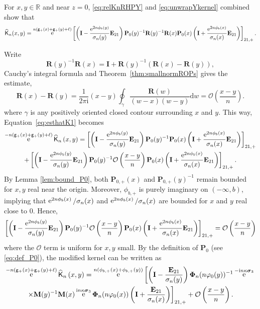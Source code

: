 \documentclass[reqno,a4paper,11pt]{amsart}
\DeclareMathOperator{\ee}{\rm e}
\newcommand{\R}{\mathbb{R}}
\newcommand{\Boh}{\mathcal{O}}
\newcommand{\ii}{\mathrm{i}}
\newcommand{\dd}{\mathrm{d}}
\renewcommand{\bm}{\mathbf}
\newcommand{\msf}{\mathsf}
\newcommand{\wh}{\widehat}
\renewcommand{\sp}{\boldsymbol \sigma}
\theoremstyle{definition}
\theoremstyle{remark}
\numberwithin{equation}{section}
\begin{document}
For $x,y \in \R$ and near $z=0$, \eqref{eq:relKnRHPY} and \eqref{eq:unwrapYkernel} combined show that 
%
\begin{equation}\label{eq:esthatK1}
\wh{\msf K}_n(x,y)
    =\ee^{n(\msf g_+(x)+\msf g_+(y)+\ell)}
    \left[\left(\bm I-\frac{\ee^{2n\phi_{b}(y)}}{\sigma_n(y)}\bm E_{21}\right)\bm P_0(y)^{-1}\bm R(y)^{-1}\bm R(x)\bm P_0(x)\left(\bm I+\frac{\ee^{2n\phi_{b}(x)}}{\sigma_n(x)}\bm E_{21}\right)\right]_{21,+}. 
\end{equation}
%

Write
%
\begin{equation}\label{eq:Rtrick}
\bm R(y)^{-1}\bm R(x)
    =\bm I+\bm R(y)^{-1}\left(\bm R(x)-\bm R(y)\right),
\end{equation}
%
Cauchy's integral formula and Theorem~\ref{thm:smallnormROPs} gives the estimate,
%
$$
\bm R(x)-\bm R(y)=\frac{1}{2\pi\ii}(x-y)\oint_\gamma\frac{\bm R(w)}{(w-x)(w-y)}\dd w=\Boh\left(\frac{x-y}{n}\right).
$$
where $\gamma$ is any positively oriented closed contour surrounding $x$  and $y$.
%
This way, Equation~\eqref{eq:esthatK1} becomes
%
\begin{multline*}
    \ee^{-n(\mathsf{g}_+(x)+\mathsf{g}_+(y)+\ell)}
    \wh{\mathsf{K}}_n\left(x,y\right)
    = \left[ \left( \bm I-\frac{\ee^{2n\phi_{b}(y)}}{\sigma_n(y)}\bm E_{21} \right) \bm P_0(y)^{-1} \bm P_0(x) \left( \bm I+\frac{\ee^{2n\phi_{b}(x)}}{\sigma_n(x)}\bm E_{21} \right) \right]_{21,+} \\
    + \left[ \left( \bm I-\frac{\ee^{2n\phi_{b}(y)}}{\sigma_n(y)}\bm E_{21} \right) \bm P_0(y)^{-1} \Boh\left(\frac{x-y}{n}\right) \bm P_0(x)\left( \bm I+\frac{\ee^{2n\phi_{b}(x)}}{\sigma_n(x)}\bm E_{21} \right) \right]_{21,+}.
\end{multline*}
%
By Lemma \ref{lem:bound_P0}, both $\bm P_{0,+}(x)$ and $\bm P_{0,+}(y)^{-1}$ remain bounded for $x,y$ real near the origin.
Moreover, $\phi_{b,+}$ is purely imaginary on $(-\infty,b)$, implying that $\ee^{2n\phi_b(x)}/\sigma_n(x)$ and $\ee^{2n\phi_b(x)}/\sigma_n(x)$ are bounded for $x$ and $y$ real close to $0$. Hence,
\[
    \left[ \left( \bm I-\frac{\ee^{2n\phi_b(y)}}{\sigma_n(y)}\bm E_{21} \right) \bm P_0(y)^{-1} \Boh\left(\frac{x-y}{n}\right) \bm P_0(x)\left( \bm I+\frac{\ee^{2n\phi_b(x)}}{\sigma_n(x)}\bm E_{21} \right) \right]_{21,+} = \Boh \left( \frac{x-y}{n}\right)
\]
where the $\Boh$ term is uniform for $x,y$ small.
By the definition of $\bm P_0$ (see \eqref{eq:def_P0}), the modified kernel can be written as
%
\begin{multline*}
    \ee^{-n(\mathsf{g}_+(x)+\mathsf{g}_+(y)+\ell)} \wh{\mathsf{K}}_n\left(x,y\right)
        =\ee^{n(\phi_{b,+}(x)+\phi_{b,+}(y))} \left[ \left( \bm I-\frac{\bm E_{21}}{\sigma_n(y)} \right) \bm \Phi_n(n\varphi_0(y))^{-1} \ee^{-\ii n\kappa\sp_3}\right. \\
    \left. \times  
     \bm M(y)^{-1} \bm M(x) \ee^{\ii n\kappa\sp_3} \bm \Phi_n(n\varphi_0(x)) \left( \bm I+\frac{\bm E_{21}}{\sigma_n(x)}\right) \right]_{21,+} + \Boh\left(\frac{x-y}{n}\right) .
    \end{multline*}
\end{document}
